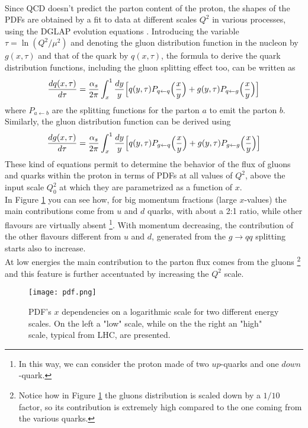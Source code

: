 \\
Since QCD doesn't predict the parton content of the proton, the shapes of the PDFs are obtained by a fit to data at different scales $Q^2$ in various processes, using the DGLAP evolution equations \cite{ALTARELLI1977298}. Introducing the variable $\tau = \ln(Q^2/\mu^2)$ and denoting the gluon distribution function in the nucleon by $g(x,\tau)$ and that of the quark by $q(x,\tau)$, the formula to derive the quark distribution functions, including the gluon splitting effect too, can be written as \cite{nagashima2010elementary}
\begin{equation}
\frac{dq(x,\tau)}{d\tau} = \frac{\alpha_s}{2\pi}\int_x^1\frac{dy}{y}\Bigl[q(y,\tau)P_{q\leftarrow q}\Bigl(\frac{x}{y}\Bigr)+g(y,\tau)P_{q\leftarrow g}\Bigl(\frac{x}{y}\Bigr)\Bigr]
\end{equation}
where $P_{a\leftarrow b}$ are the splitting functions for the parton $a$ to emit the parton $b$.
\\ 
Similarly, the gluon distribution function can be derived using
\begin{equation}
\frac{dg(x,\tau)}{d\tau} = \frac{\alpha_s}{2\pi}\int_x^1\frac{dy}{y}\Bigl[q(y,\tau)P_{g\leftarrow q}\Bigl(\frac{x}{y}\Bigr)+g(y,\tau)P_{g\leftarrow g}\Bigl(\frac{x}{y}\Bigr)\Bigr]
\end{equation}
These kind of equations permit to determine the behavior of the flux of gluons and quarks within the proton in terms of PDFs at all values of $Q^2$, above the input scale $Q_0^2$ at which they are parametrized as a function of $x$.
\\
In Figure \ref{pdf} you can see how, for big momentum fractions (large $x$-values) the main contributions come from $u$ and $d$ quarks, with about a 2:1 ratio, while other flavours are virtually absent
\footnote{In this way, we can consider the proton made of two $up$-quarks and one $down$-quark.}.
With momentum decreasing, the contribution of the other flavours different from $u$ and $d$, generated from the $g \rightarrow qq$ splitting starts also to increase.
\\
At low energies the main contribution to the parton flux comes from the gluons
\footnote{Notice how in Figure \ref{pdf} the gluons distribution is scaled down by a $1/10$ factor, so its contribution is extremely high compared to the one coming from the various quarks.}
and this feature is further accentuated by increasing the $Q^2$ scale.
\begin{figure}[t]
\centering
\texttt{[image: pdf.png]}
\caption{PDF's $x$ dependencies on a logarithmic scale for two different energy scales. On the left a "low" scale, while on the the right an "high" scale, typical from LHC, are presented. }
\label{pdf}
\end{figure}

